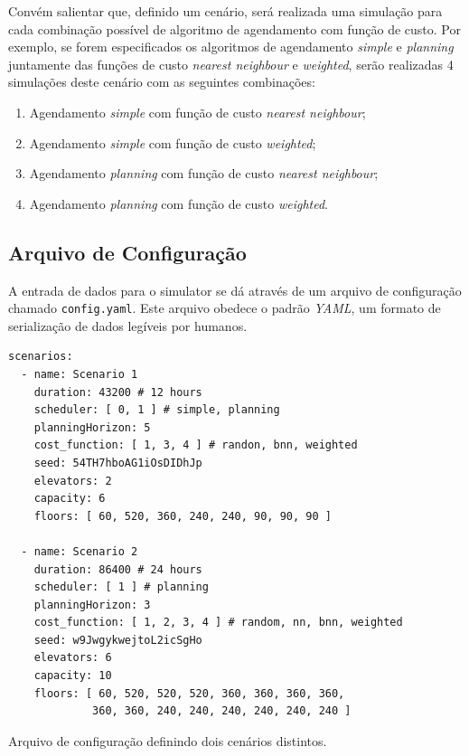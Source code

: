 Convém salientar que, definido um cenário, será realizada uma simulação para cada
combinação possível de algoritmo de agendamento com função de custo. Por
exemplo, se forem especificados os algoritmos de agendamento \textit{simple} e
\textit{planning} juntamente das funções de custo \textit{nearest neighbour} e
\textit{weighted}, serão realizadas 4 simulações deste cenário com as seguintes
combinações:

\begin{enumerate}
  \item Agendamento \textit{simple} com função de custo \textit{nearest neighbour};
  \item Agendamento \textit{simple} com função de custo \textit{weighted};
  \item Agendamento \textit{planning} com função de custo \textit{nearest neighbour};
  \item Agendamento \textit{planning} com função de custo \textit{weighted}.
\end{enumerate}

\subsection{\label{model:scenario:config}Arquivo de Configuração}

A entrada de dados para o simulator se dá através de um arquivo de configuração
chamado \texttt{config.yaml}. Este arquivo obedece o padrão \textit{YAML}, um
formato de serialização de dados legíveis por humanos.

\begin{algorithm}[htb]
  \centering
    \begin{verbatim}
scenarios:
  - name: Scenario 1
    duration: 43200 # 12 hours
    scheduler: [ 0, 1 ] # simple, planning
    planningHorizon: 5
    cost_function: [ 1, 3, 4 ] # randon, bnn, weighted
    seed: 54TH7hboAG1iOsDIDhJp
    elevators: 2
    capacity: 6
    floors: [ 60, 520, 360, 240, 240, 90, 90, 90 ]

  - name: Scenario 2
    duration: 86400 # 24 hours
    scheduler: [ 1 ] # planning
    planningHorizon: 3
    cost_function: [ 1, 2, 3, 4 ] # random, nn, bnn, weighted
    seed: w9JwgykwejtoL2icSgHo
    elevators: 6
    capacity: 10
    floors: [ 60, 520, 520, 520, 360, 360, 360, 360,
             360, 360, 240, 240, 240, 240, 240, 240 ]
    \end{verbatim}
  \caption{Arquivo de configuração definindo dois cenários distintos.}
  \label{alg:config}
\end{algorithm}

